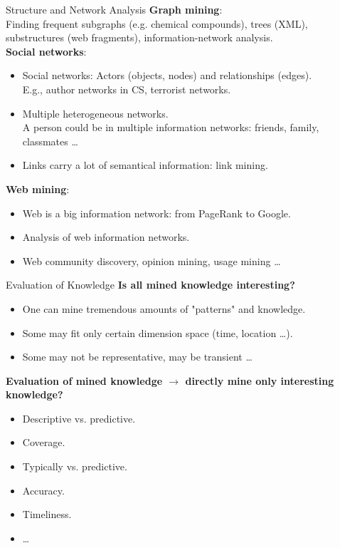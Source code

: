 \begin{frame}{Structure and Network Analysis}
	\textbf{Graph mining}:\\
	Finding frequent subgraphs (e.g. chemical compounds), trees (XML), 
	substructures (web fragments), information-network analysis.\\[0.2cm]
	
	\textbf{Social networks}:
	\begin{itemize}
		\item Social networks: Actors (objects, nodes) and relationships 
		(edges).\\
		E.g., author networks in CS, terrorist networks.
		\item Multiple heterogeneous networks.\\
		A person could be in multiple information networks: friends, family, 
		classmates \ldots
		\item Links carry a lot of semantical information: link mining.
	\end{itemize}
	
	\textbf{Web mining}:
	\begin{itemize}
		\item Web is a big information network: from PageRank to Google.
		\item Analysis of web information networks.
		\item Web community discovery, opinion mining, usage mining \ldots
	\end{itemize}
\end{frame}

\begin{frame}{Evaluation of Knowledge}
	\textbf{Is all mined knowledge interesting?}
	\begin{itemize}
		\item One can mine tremendous amounts of "patterns" and knowledge.
		\item Some may fit only certain dimension space (time, location \ldots).
		\item Some may not be representative, may be transient \ldots
	\end{itemize}
	
	\textbf{Evaluation of mined knowledge $\rightarrow$ directly mine only 
	interesting knowledge?}
	\begin{itemize}
		\item Descriptive vs. predictive.
		\item Coverage.
		\item Typically vs. predictive.
		\item Accuracy.
		\item Timeliness.
		\item \ldots
	\end{itemize}
\end{frame}